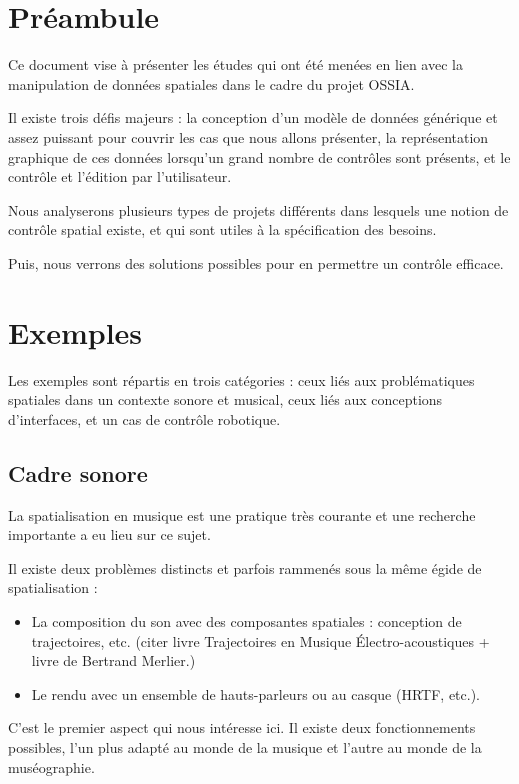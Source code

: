 \documentclass[french]{article}
\begin{document}
\section{Préambule}
Ce document vise à présenter les études qui ont été menées en lien avec 
la manipulation de données spatiales dans le cadre du projet OSSIA.

Il existe trois défis majeurs : la conception d'un modèle de données générique et assez puissant pour couvrir les cas que nous allons présenter, la représentation graphique de ces données lorsqu'un grand nombre de contrôles sont présents, et le contrôle et l'édition par l'utilisateur.

Nous analyserons plusieurs types de projets différents dans lesquels une notion
de contrôle spatial existe, et qui sont utiles à la spécification des besoins.

Puis, nous verrons des solutions possibles pour en permettre un contrôle efficace.

\section{Exemples}
Les exemples sont répartis en trois catégories : ceux liés aux problématiques spatiales dans un contexte sonore et musical, ceux liés aux conceptions d'interfaces, et un cas de contrôle robotique.

\subsection{Cadre sonore}
La spatialisation en musique est une pratique très courante et une recherche importante a eu lieu sur ce sujet.

Il existe deux problèmes distincts et parfois rammenés sous la même égide de spatialisation : 
\begin{itemize}
\item La composition du son avec des composantes spatiales : conception de trajectoires, etc. (citer livre Trajectoires en Musique Électro-acoustiques + livre de Bertrand Merlier.)
\item Le rendu avec un ensemble de hauts-parleurs ou au casque (HRTF, etc.).
\end{itemize}

C'est le premier aspect qui nous intéresse ici. 
Il existe deux fonctionnements possibles, l'un plus adapté au monde de la musique et l'autre au monde de la muséographie. 
\end{document}

